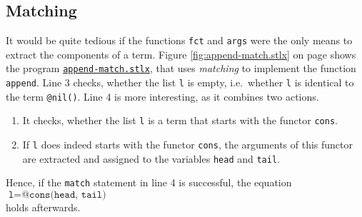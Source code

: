\subsection{Matching}
It would be quite tedious if the functions \texttt{fct} and \texttt{args} were the only means to extract the
components of a term.  Figure \ref{fig:append-match.stlx} on page \pageref{fig:append-match.stlx}
shows the program
\href{https://github.com/karlstroetmann/Logik/blob/master/SetlX/append-match.stlx}{\texttt{append-match.stlx}}, 
that uses \emph{matching} to implement the function \texttt{append}.  
Line 3 checks, whether the list  \texttt{l} is empty, i.e.~whether \texttt{l} is identical to the term 
\texttt{@nil()}.  Line 4 is more interesting, as it combines two actions.
\begin{enumerate}
\item It checks, whether the list \texttt{l} is a term that starts with the functor \texttt{cons}.
\item If \texttt{l} does indeed starts with the functor \texttt{cons}, the arguments of this functor are
      extracted and assigned to the variables \texttt{head} and \texttt{tail}.
\end{enumerate}
Hence, if the \texttt{match} statement in line 4 is successful, the equation
\\[0.2cm]
\hspace*{1.3cm}
$\texttt{l} = \texttt{@cons(head, tail)}$
\\[0.2cm]
holds afterwards.


